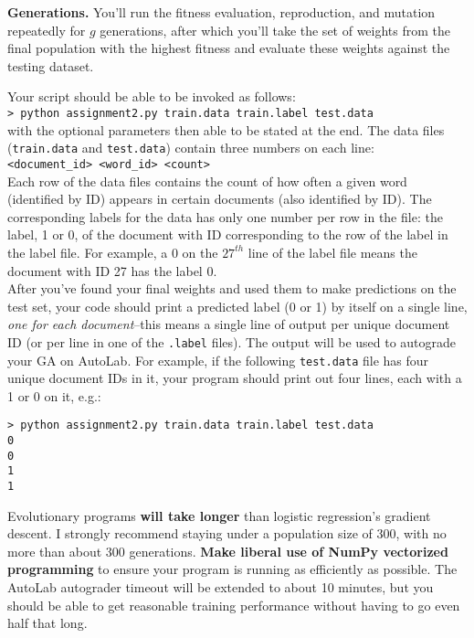\documentclass[paper=a4, fontsize=11pt]{scrartcl} %
\numberwithin{figure}{section} %
\numberwithin{table}{section} %
\begin{document}
\textbf{Generations.} You'll run the fitness evaluation, reproduction, and mutation repeatedly for $g$ generations, after which you'll take the set of weights from the final population with the highest fitness and evaluate these weights against the testing dataset.

Your script should be able to be invoked as follows: \\

\texttt{> python assignment2.py train.data train.label test.data} \\

with the optional parameters then able to be stated at the end. The data files (\texttt{train.data} and \texttt{test.data}) contain three numbers on each line: \\

\texttt{<document\_id> <word\_id> <count>} \\

Each row of the data files contains the count of how often a given word (identified by ID) appears in certain documents (also identified by ID). The corresponding labels for the data has only one number per row in the file: the label, 1 or 0, of the document with ID corresponding to the row of the label in the label file. For example, a 0 on the $27^{th}$ line of the label file means the document with ID 27 has the label 0. \\

After you've found your final weights and used them to make predictions on the test set, your code should print a predicted label (0 or 1) by itself on a single line, \emph{one for each document}--this means a single line of output per unique document ID (or per line in one of the \texttt{.label} files). The output will be used to autograde your GA on AutoLab. For example, if the following \texttt{test.data} file has four unique document IDs in it, your program should print out four lines, each with a 1 or 0 on it, e.g.:

\begin{verbatim}
> python assignment2.py train.data train.label test.data
0
0
1
1
\end{verbatim}

Evolutionary programs \textbf{will take longer} than logistic regression's gradient descent. I strongly recommend staying under a population size of 300, with no more than about 300 generations. \textbf{Make liberal use of NumPy vectorized programming} to ensure your program is running as efficiently as possible. The AutoLab autograder timeout will be extended to about 10 minutes, but you should be able to get reasonable training performance without having to go even half that long.
\end{document}
